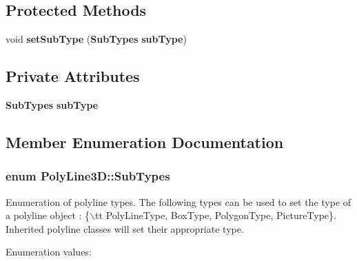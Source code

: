 \subsection*{Protected Methods}
\begin{CompactItemize}
\item 
void {\bf set\-Sub\-Type} ({\bf Sub\-Types} {\bf sub\-Type})
\end{CompactItemize}
\subsection*{Private Attributes}
\begin{CompactItemize}
\item 
{\bf Sub\-Types} {\bf sub\-Type}
\end{CompactItemize}


\subsection{Member Enumeration Documentation}
\subsubsection{\setlength{\rightskip}{0pt plus 5cm}enum Poly\-Line3D::Sub\-Types}\label{classPolyLine3D_s5}


Enumeration of polyline types. The following types can be used to set the type of a polyline object : \{$\backslash$tt Poly\-Line\-Type, Box\-Type, Polygon\-Type, Picture\-Type\}. Inherited polyline classes will set their appropriate type. \begin{Desc}
\item[Enumeration values: ]\par
\begin{description}
\item[{\em 
{\em Poly\-Line3DType}\label{classPolyLine3D_s5s0}
}]\item[{\em 
{\em Box\-Type}\label{classPolyLine3D_s5s1}
}]\item[{\em 
{\em Polygon\-Type}\label{classPolyLine3D_s5s2}
}]\item[{\em 
{\em Arc\-Box\-Type}\label{classPolyLine3D_s5s3}
}]\item[{\em 
{\em Picture\-Type}\label{classPolyLine3D_s5s4}
}]\end{description}
\end{Desc}



